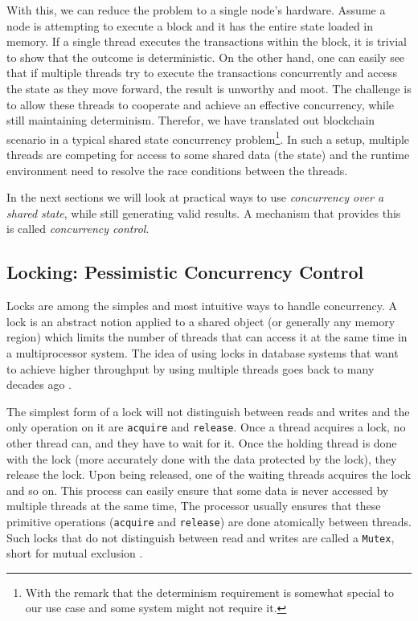 With this, we can reduce the problem to a single node's hardware. Assume a node is attempting to
execute a block and it has the entire state loaded in memory. If a single thread executes the
transactions within the block, it is trivial to show that the outcome is deterministic. On the other
hand, one can easily see that if multiple threads try to execute the transactions concurrently and
access the state as they move forward, the result is unworthy and moot. The challenge is to allow
these threads to cooperate and achieve an effective concurrency, while still maintaining
determinism. Therefor, we have translated out blockchain scenario in a typical shared state
concurrency problem\footnote{With the remark that the determinism requirement is somewhat special to
our use case and some system might not require it.}. In such a setup, multiple threads are competing
for access to some shared data (the state) and the runtime environment need to resolve the race
conditions between the threads.

In the next sections we will look at practical ways to use \textit{concurrency over a shared state},
while still generating valid results. A mechanism that provides this is called \textit{concurrency
control}.

\subsection{Locking: Pessimistic Concurrency Control} \label{chap_bg:subsec:lock}

Locks are among the simples and most intuitive ways to handle concurrency. A lock is an abstract
notion applied to a shared object (or generally any memory region) which limits the number of
threads that can access it at the same time in a multiprocessor system. The idea of using locks in
database systems that want to achieve higher throughput by using multiple threads goes back to many
decades ago \cite{kedemControllingConcurrencyUsing1979, morrisPerformanceAnalysisLocking1985}.

The simplest form of a lock will not distinguish between reads and writes and the only operation on
it are \texttt{acquire} and \texttt{release}. Once a thread acquires a lock, no other thread can,
and they have to wait for it. Once the holding thread is done with the lock (more accurately done
with the data protected by the lock), they release the lock. Upon being released, one of the waiting
threads acquires the lock and so on. This process can easily ensure that some data is never accessed
by multiple threads at the same time, The processor usually ensures that these primitive operations
(\texttt{acquire} and \texttt{release}) are done atomically between threads. Such locks that do not
distinguish between read and writes are called a \texttt{Mutex}, short for mutual exclusion
\cite{guerraouiLockUnlockThat2019}.


